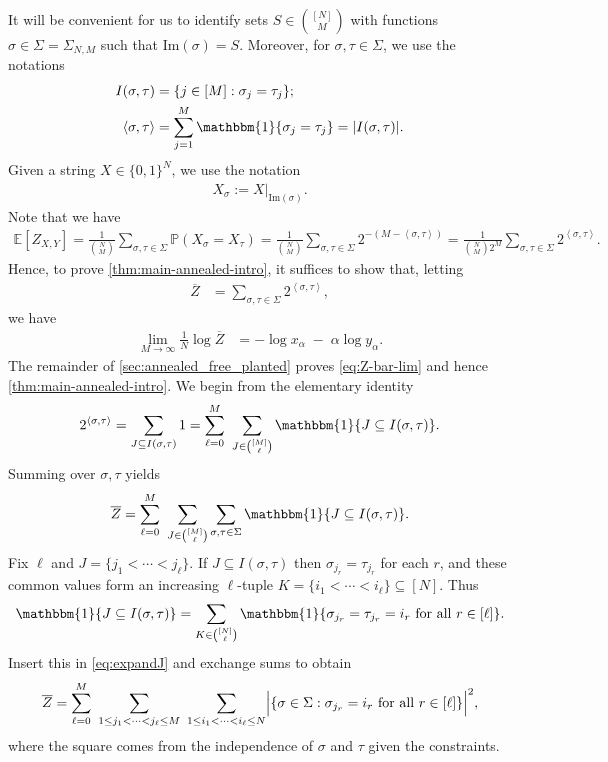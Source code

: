 \documentclass[11pt]{amsart}
\numberwithin{equation}{section}
\numberwithin{equation}{section}
\newcommand{\brac}[1]{\left \langle #1 \right \rangle}
\newcommand{\1}{\mathbbm{1}}
\newcommand{\E}{\mathbb{E}}
\newcommand{\Prob}{\mathbb{P}}
\theoremstyle{definition}
\begin{document}
It will be convenient for us to identify sets $S \in \binom{[N]}{M}$ with functions $\sigma\in \Sigma = \Sigma_{N,M}$ such that $\text{Im}(\sigma)=S.$ Moreover, for $\sigma,\tau \in \Sigma$, we use the notations
\begin{align*}
    I(\sigma,\tau) &= \{j \in [M]: \sigma_j = \tau_j\}; \\
    \brac{\sigma,\tau} &= \sum_{j=1}^M \1\{\sigma_j = \tau_j\} = |I(\sigma,\tau)|.
\end{align*}
Given a string $X \in \{0,1\}^N$, we use the notation
\begin{align*}
    X_\sigma := X|_{\text{Im}(\sigma)}.
\end{align*}
Note that we have
\begin{align*}
    \E\left[ Z_{X, Y} \right] = \frac{1}{\binom{N}{M}} \sum_{\sigma,\tau\in \Sigma} \Prob\left(X_\sigma = X_\tau \right) = \frac{1}{\binom{N}{M}} \sum_{\sigma,\tau \in\Sigma} 2^{-(M - \brac{\sigma,\tau})} = \frac{1}{\binom{N}{M}2^M}\sum_{\sigma,\tau \in\Sigma}  2^{\brac{\sigma,\tau}}.
\end{align*}
Hence, to prove \cref{thm:main-annealed-intro}, it suffices to show that, letting
\begin{align*}
    \overline{Z} &= \sum_{\sigma,\tau \in\Sigma}  2^{\brac{\sigma,\tau}},
\end{align*}
we have
\begin{align}\label{eq:Z-bar-lim}
    \lim_{M\to\infty} \frac{1}{N}\log \overline{Z} &= -\log x_\alpha\;-\;\alpha\log y_\alpha.
\end{align}
The remainder of \cref{sec:annealed_free_planted} proves \eqref{eq:Z-bar-lim} and hence \cref{thm:main-annealed-intro}. We begin from the elementary identity
\[
2^{\brac{\sigma,\tau}}
=\sum_{J\subseteq I(\sigma,\tau)} 1
=\sum_{\ell=0}^{M}\ \sum_{J\in\binom{[M]}{\ell}} \1\{J\subseteq I(\sigma,\tau)\}.
\]
Summing over $\sigma,\tau$ yields
\begin{equation}\label{eq:expandJ}
\overline{Z} =\sum_{\ell=0}^M\ \sum_{J\in\binom{[M]}{\ell}} \sum_{\sigma,\tau\in\Sigma}\1\{J\subseteq I(\sigma,\tau)\}.
\end{equation}
Fix $\ell$ and $J=\{j_1<\cdots<j_\ell\}$. If $J\subseteq I(\sigma,\tau)$ then
$\sigma_{j_r}=\tau_{j_r}$ for each $r$, and these common values form an increasing $\ell$-tuple
$K=\{i_1<\cdots<i_\ell\}\subseteq [N]$. Thus
\begin{align*}
    \1\{J\subseteq I(\sigma,\tau)\} =\sum_{K\in\binom{[N]}{\ell}}\1\{\sigma_{j_r}=\tau_{j_r}=i_r \text{ for all } r \in [\ell]\}.
\end{align*}
Insert this in \eqref{eq:expandJ} and exchange sums to obtain
\begin{equation}\label{eq:expandJK}
    \overline{Z} =\sum_{\ell=0}^M\ \sum_{1\le j_1<\cdots<j_\ell\le M}\ \sum_{1\le i_1<\cdots<i_\ell\le N} \Bigl|\{\sigma\in\Sigma:\sigma_{j_r}=i_r \text{ for all } r \in [\ell] \}\Bigr|^2,
\end{equation}
where the square comes from the independence of $\sigma$ and $\tau$ given the constraints.
\end{document}
